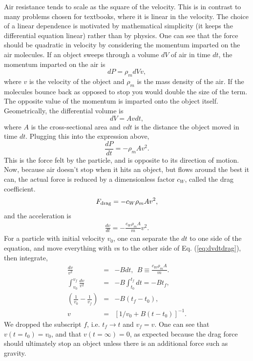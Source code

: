 Air resistance tends to scale as the square of the velocity. This is in contrast to many problems chosen for textbooks, where it is linear in the velocity. The choice of a linear dependence is motivated by mathematical simplicity (it keeps the differential equation linear) rather than by physics. One can see that the force should be quadratic in velocity by considering the momentum imparted on the air molecules. If an object sweeps through a volume $dV$ of air in time $dt$, the momentum imparted on the air is \begin{equation}
dP=\rho_m dV v,
\end{equation}
where $v$ is the velocity of the object and $\rho_m$ is the mass density of the air. If the molecules bounce back as opposed to stop you would double the size of the term. The opposite value of the momentum is imparted onto the object itself. Geometrically, the differential volume is
\begin{equation}
dV=Avdt,
\end{equation}
where $A$ is the cross-sectional area and $vdt$ is the distance the object moved in time $dt$. Plugging this into the expression above,
\begin{equation}
\frac{dP}{dt}=-\rho_m A v^2.
\end{equation}
This is the force felt by the particle, and is opposite to its direction of motion. Now, because air doesn't stop when it hits an object, but flows around the best it can, the actual force is reduced by a dimensionless factor $c_W$, called the drag coefficient. 
\begin{equation}
F_{\rm drag}=-c_W\rho_m Av^2,
\end{equation}
and the acceleration is
\begin{eqnarray}
\label{eq:dvdtdrag}
\frac{dv}{dt}=-\frac{c_W\rho_mA}{m}v^2.
\end{eqnarray}
For a particle with initial velocity $v_0$, one can separate the $dt$ to one side of the equation, and move everything with $v$s to the other side of Eq. (\ref{eq:dvdtdrag}), then integrate,
\begin{eqnarray}
\frac{dv}{v^2}&=&-Bdt, ~~B\equiv \frac{c_W\rho_mA}{m}.\\
\nonumber
\int_{v_0}^{v_f}\frac{dv}{v^2}&=&-B\int_{t_0}^{t_f} dt=-Bt_f,\\
\nonumber
\left(\frac{1}{v_0}-\frac{1}{v_f}\right)&=&-B(t_f-t_0),\\
\nonumber
v&=&\left[1/v_0+B(t-t_0)\right]^{-1}.
\end{eqnarray}
We dropped the subscript $f$, i.e. $t_f\rightarrow t$ and $v_f=v$. One can see that $v(t=t_0)=v_0$, and that $v(t=\infty)=0$, as expected because the drag force should ultimately stop an object unless there is an additional force such as gravity.

